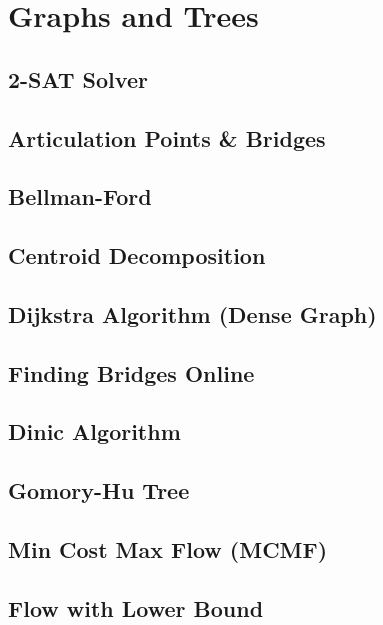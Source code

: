 \section{Graphs and Trees}
\subsection{2-SAT Solver}

\subsection{Articulation Points \& Bridges}

\subsection{Bellman-Ford}

\subsection{Centroid Decomposition}

\subsection{Dijkstra Algorithm (Dense Graph)}

\subsection{Finding Bridges Online}

\subsection{Dinic Algorithm}

\subsection{Gomory-Hu Tree}

\subsection{Min Cost Max Flow (MCMF)}

\subsection{Flow with Lower Bound}

